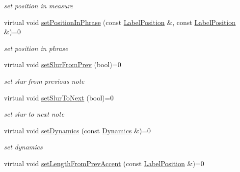 \begin{DoxyCompactItemize}
\begin{DoxyCompactList}\small\item\em set position in measure \end{DoxyCompactList}\item 
\hypertarget{classsinsy_1_1INoteLabel_a5e81fedeba366969f4a31eb3ae775289}{virtual void \hyperlink{classsinsy_1_1INoteLabel_a5e81fedeba366969f4a31eb3ae775289}{set\-Position\-In\-Phrase} (const \hyperlink{classsinsy_1_1LabelPosition}{\-Label\-Position} \&, const \hyperlink{classsinsy_1_1LabelPosition}{\-Label\-Position} \&)=0}\label{classsinsy_1_1INoteLabel_a5e81fedeba366969f4a31eb3ae775289}

\begin{DoxyCompactList}\small\item\em set position in phrase \end{DoxyCompactList}\item 
\hypertarget{classsinsy_1_1INoteLabel_a4d6d95388916cea8c4fa7646dcc5dc4c}{virtual void \hyperlink{classsinsy_1_1INoteLabel_a4d6d95388916cea8c4fa7646dcc5dc4c}{set\-Slur\-From\-Prev} (bool)=0}\label{classsinsy_1_1INoteLabel_a4d6d95388916cea8c4fa7646dcc5dc4c}

\begin{DoxyCompactList}\small\item\em set slur from previous note \end{DoxyCompactList}\item 
\hypertarget{classsinsy_1_1INoteLabel_ab9619cc498ff3ddb2cc9a310a4fbddd4}{virtual void \hyperlink{classsinsy_1_1INoteLabel_ab9619cc498ff3ddb2cc9a310a4fbddd4}{set\-Slur\-To\-Next} (bool)=0}\label{classsinsy_1_1INoteLabel_ab9619cc498ff3ddb2cc9a310a4fbddd4}

\begin{DoxyCompactList}\small\item\em set slur to next note \end{DoxyCompactList}\item 
\hypertarget{classsinsy_1_1INoteLabel_a2a0c5043698dd60c1b9ea448d6ce39e8}{virtual void \hyperlink{classsinsy_1_1INoteLabel_a2a0c5043698dd60c1b9ea448d6ce39e8}{set\-Dynamics} (const \hyperlink{classsinsy_1_1Dynamics}{\-Dynamics} \&)=0}\label{classsinsy_1_1INoteLabel_a2a0c5043698dd60c1b9ea448d6ce39e8}

\begin{DoxyCompactList}\small\item\em set dynamics \end{DoxyCompactList}\item 
\hypertarget{classsinsy_1_1INoteLabel_ac8726aec10e115e6c33ea9b758ac120c}{virtual void \hyperlink{classsinsy_1_1INoteLabel_ac8726aec10e115e6c33ea9b758ac120c}{set\-Length\-From\-Prev\-Accent} (const \hyperlink{classsinsy_1_1LabelPosition}{\-Label\-Position} \&)=0}\label{classsinsy_1_1INoteLabel_ac8726aec10e115e6c33ea9b758ac120c}


\end{DoxyCompactItemize}
